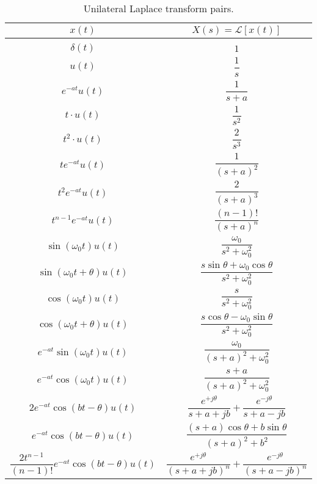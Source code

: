 \documentclass{report}
\begin{document}
\begin{table}[hbt!]
    \centering
    \caption{Unilateral Laplace transform pairs.}
    \label{laplace_pairs}
    \begin{tabular}{|c|c|}
        \hline
        $x(t)$ & $X(s)=\mathcal{L}[x(t)]$ \\[0.15cm]
        \hline
        & \\[0.1cm]
        $\delta(t)$ & $1$ \\[0.5cm]
        $u(t)$ & $\dfrac{1}{s}$ \\[0.5cm]
        $e^{-at}u(t)$ & $\dfrac{1}{s+a}$ \\[0.5cm]
        $t\cdot u(t)$ & $\dfrac{1}{s^2}$ \\[0.5cm]
        $t^2\cdot u(t)$ & $\dfrac{2}{s^3}$ \\[0.5cm]
        $te^{-at}u(t)$ & $\dfrac{1}{(s+a)^2}$ \\[0.5cm]
        $t^2e^{-at}u(t)$ & $\dfrac{2}{(s+a)^3}$ \\[0.5cm]
        $t^{n-1}e^{-at}u(t)$ & $\dfrac{(n-1)!}{(s+a)^n}$ \\[0.5cm]
        $\sin(\omega_0 t)u(t)$ & $\dfrac{\omega_0}{s^2+\omega_0^2}$ \\[0.5cm]
        $\sin(\omega_0 t+\theta)u(t)$ & $\dfrac{s\sin\theta + \omega_0\cos\theta}{s^2+\omega_0^2}$ \\[0.5cm]
        $\cos(\omega_0 t)u(t)$ & $\dfrac{s}{s^2+\omega_0^2}$ \\[0.5cm]
        $\cos(\omega_0 t+\theta)u(t)$ & $\dfrac{s\cos\theta - \omega_0\sin\theta}{s^2+\omega_0^2}$ \\[0.5cm]
        $e^{-at}\sin(\omega_0 t)u(t)$ & $\dfrac{\omega_0}{(s+a)^2+\omega_0^2}$ \\[0.5cm]
        $e^{-at}\cos(\omega_0 t)u(t)$ & $\dfrac{s+a}{(s+a)^2+\omega_0^2}$ \\[0.5cm]
        $2e^{-at}\cos(bt-\theta)u(t)$ & $\dfrac{e^{+j\theta}}{s+a+jb}+\dfrac{e^{-j\theta}}{s+a-jb}$ \\[0.5cm]
        $e^{-at}\cos(bt-\theta)u(t)$ & $\dfrac{(s+a)\cos\theta+b\sin\theta}{(s+a)^2+b^2}$ \\[0.5cm]
        $\dfrac{2t^{n-1}}{(n-1)!}e^{-at}\cos(bt-\theta)u(t)$ & $\dfrac{e^{+j\theta}}{(s+a+jb)^n}+\dfrac{e^{-j\theta}}{(s+a-jb)^n}$ \\[0.5cm]
        \hline
    \end{tabular}
\end{table}

\pagebreak [4]
\end{document}
